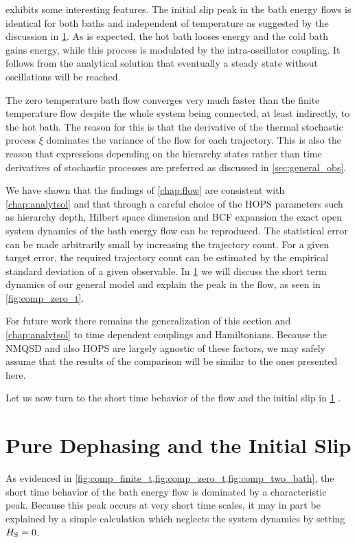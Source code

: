  exhibits some interesting features. The
initial slip peak in the bath energy flows is identical for both baths
and independent of temperature as suggested by the discussion in
\cref{sec:pure_deph}. As is expected, the hot bath looses energy and
the cold bath gains energy, while this process is modulated by the
intra-oscillator coupling. It follows from the analytical solution
that eventually a steady state without oscillations will be reached.

The zero temperature bath flow converges very much faster than the
finite temperature flow despite the whole system being connected, at
least indirectly, to the hot bath. The reason for this is that the
derivative of the thermal stochastic process \(\dot{ξ}\) dominates the
variance of the flow for each trajectory. This is also the reason that
expressions depending on the hierarchy states rather than time
derivatives of stochastic processes are preferred as discussed in
\cref{sec:general_obs}.

We have shown that the findings of \cref{chap:flow} are consistent
with \cref{chap:analytsol} and that through a careful choice of the
HOPS parameters such as hierarchy depth, Hilbert space dimension and
BCF expansion the exact open system dynamics of the bath energy flow
can be reproduced. The statistical error can be made arbitrarily small
by increasing the trajectory count. For a given target error, the
required trajectory count can be estimated by the empirical standard
deviation of a given observable. In \cref{sec:pure_deph} we will
discuss the short term dynamics of our general model and explain the
peak in the flow, as seen in \cref{fig:comp_zero_t}.

For future work there remains the generalization of this section and
\cref{chap:analytsol} to time dependent couplings and
Hamiltonians. Because the NMQSD and also HOPS are largely agnostic of
these factors, we may safely assume that the results of the comparison
will be similar to the ones presented here.

Let us now turn to the short time behavior of the flow and the initial
slip in \cref{sec:pure_deph} .

\section{Pure Dephasing and the Initial Slip}
\label{sec:pure_deph}
As evidenced in
\cref{fig:comp_finite_t,fig:comp_zero_t,fig:comp_two_bath}, the short
time behavior of the bath energy flow is dominated by a characteristic
peak. Because this peak occurs at very short time scales, it may in
part be explained by a simple calculation which neglects the system
dynamics by setting \(H_{\mathrm{S}}=0\).


